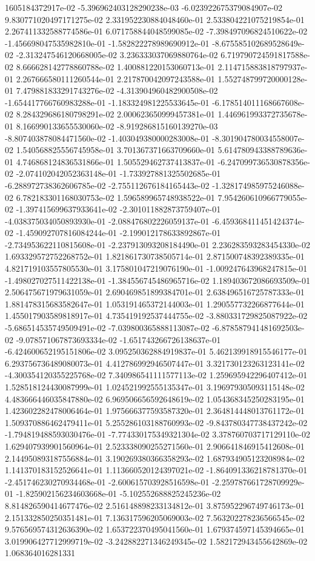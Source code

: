 1605184372917e-02	-5.396962403128290238e-03	-6.023922675379084907e-02	9.830771020497171275e-02	2.331952230884048460e-01	2.533804221075219854e-01	2.267411332588774586e-01	6.071758844048599085e-02	-7.398497096824510622e-02	-1.456698047535982810e-01	-1.582822278989690912e-01	-8.675585102689528649e-02	-2.313247546120668005e-02	3.236333037069880764e-02	6.719790724591817588e-02	8.666628142778860788e-02	1.400881220153060713e-01	2.114715883818797937e-01	2.267666580111260544e-01	2.217870042097243588e-01	1.552748799720000128e-01	7.479881833291743276e-02	-4.313904960482900508e-02	-1.654417766760983288e-01	-1.183324981225533645e-01	-6.178514011168667608e-02	8.284329686180798291e-02	2.000623650999457381e-01	1.446961993372735678e-01	8.166990133655530060e-02	-8.919286815160139270e-03	-8.807403878084471560e-02	-1.403049380000283008e-01	-8.301904780034558007e-02	1.540568825556745958e-01	3.701367371663709660e-01	5.614780943388789636e-01	4.746868124836531866e-01	1.505529462737413837e-01	-6.247099736530878356e-02	-2.074102042052363148e-01	-1.733927881325502685e-01	-6.288972738362606785e-02	-2.755112676184165443e-02	-1.328174985975246088e-02	6.782183301168030753e-02	1.596589965748938522e-01	7.954260610966779055e-02	-1.397415699637933641e-02	-2.301011882873759407e-01	-4.038375034050893930e-01	-2.088476802226059137e-01	-6.459368411451424374e-02	-1.459092707816084244e-01	-2.199012178633892867e-01	-2.734953622110815608e-01	-2.237913093208184490e-01	2.236283593283454330e-02	1.693329572752268752e-01	1.821861730738505714e-01	2.871500748392389335e-01	4.821719103557805530e-01	3.175801047219076190e-01	-1.009247643968247815e-01	-1.498027027511422138e-01	-1.384556745486965716e-02	1.189403672086693509e-01	2.506475671979631059e-01	2.690469851899384701e-01	2.638496516725787333e-01	1.881478315683582647e-01	1.053191465372144003e-01	1.290557732266877644e-01	1.455017903589818917e-01	4.735419192537444755e-02	-3.880331729825087922e-02	-5.686514535749509491e-02	-7.039800365888113087e-02	-6.878587941481692503e-02	-9.078571067873693334e-02	-1.651743266726138637e-01	-6.424600652195151806e-02	3.095250362884919837e-01	5.462139918915546177e-01	6.293756736489080073e-01	4.412786992946507447e-01	3.321730123263123141e-02	-4.300354120355225768e-02	7.340986541111577113e-02	1.259695942296407412e-01	1.528518124430087999e-01	1.024521992555135347e-01	3.196979305093115148e-02	4.483666446035847880e-02	6.969506656592648619e-02	1.054368345250283195e-01	1.423602282478006464e-01	1.975666377593587320e-01	2.364814448013761172e-01	1.509370886462479411e-01	5.255286103188760993e-02	-9.843780347738437242e-02	-1.794819488593030476e-01	-7.774330175349321304e-02	3.378760703717129110e-02	1.629407939901560964e-01	2.523338090255271560e-01	2.906641846915412608e-01	2.144950893187556884e-01	3.190269380366358293e-02	1.687934905123208984e-02	1.141370183152526641e-01	1.113660520124397021e-02	-1.864091336218781370e-01	-2.451746230270934468e-01	-2.600615703928516598e-01	-2.259787661728709929e-01	-1.825902156234603668e-01	-5.102552688825245236e-02	8.814826590414677476e-02	2.516148898233134812e-01	3.875952296749746173e-01	2.151332850250351481e-01	7.136317596205069003e-02	7.563202278236566545e-02	9.576569574312636390e-02	1.653722370495041560e-01	1.679374597145394665e-01	3.019906427712999719e-02	-3.242882271346249345e-02	1.582172943455642869e-02	1.068364016281331